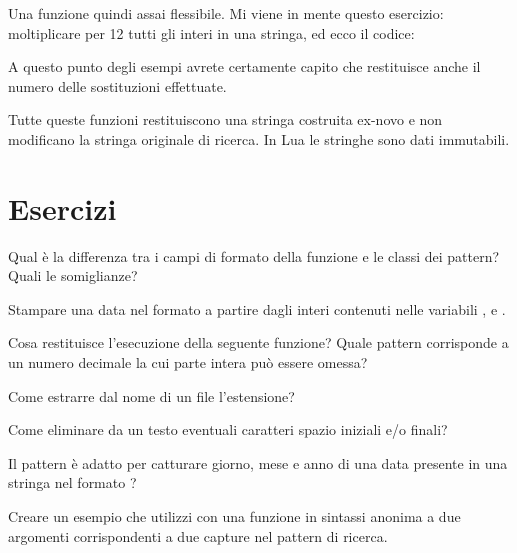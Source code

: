 Una funzione quindi assai flessibile. Mi viene in mente questo esercizio:
moltiplicare per 12 tutti gli interi in una stringa, ed ecco il codice:

A questo punto degli esempi avrete certamente capito che  restituisce
anche il numero delle sostituzioni effettuate.

Tutte queste funzioni restituiscono una stringa costruita ex-novo e non
modificano la stringa originale di ricerca. In Lua le stringhe sono dati
immutabili.



\section{Esercizi}

\begin{Exercise}[label=libstd-01]
Qual è la differenza tra i campi di formato della funzione  e
le classi dei pattern? Quali le somiglianze?
\end{Exercise}

\begin{Exercise}[label=libstd-02]
Stampare una data nel formato  a partire dagli interi contenuti
nelle variabili ,  e .
\end{Exercise}

\begin{Exercise}[label=libstd-03]
Cosa restituisce l'esecuzione della seguente funzione?
Quale pattern corrisponde a un numero decimale la cui parte intera può essere
omessa?
\end{Exercise}

\begin{Exercise}[label=libstd-04]
Come estrarre dal nome di un file l'estensione?
\end{Exercise}

\begin{Exercise}[label=libstd-05]
Come eliminare da un testo eventuali caratteri spazio iniziali e/o finali?
\end{Exercise}

\begin{Exercise}[label=libstd-06]
Il pattern  è adatto per catturare giorno, mese e
anno di una data presente in una stringa nel formato ?
\end{Exercise}

\begin{Exercise}[label=libstd-07]
Creare un esempio che utilizzi  con una funzione in sintassi
anonima a due argomenti corrispondenti a due capture nel pattern di ricerca.
\end{Exercise}


